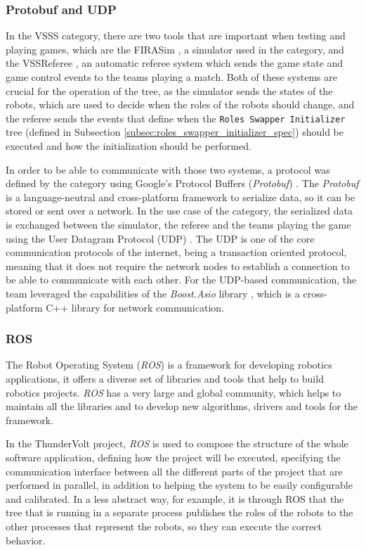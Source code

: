 \subsubsection{Protobuf and UDP}

In the VSSS category, there are two tools that are important when testing and playing games, which are the FIRASim \cite{FIRASim}, a simulator used in the category, and the VSSReferee \cite{VSSReferee}, an automatic referee system which sends the game state and game control events to the teams playing a match. Both of these systems are crucial for the operation of the tree, as the simulator sends the states of the robots, which are used to decide when the roles of the robots should change, and the referee sends the events that define when the \texttt{Roles Swapper Initializer} tree (defined in Subsection \ref{subsec:roles_swapper_initializer_spec}) should be executed and how the initialization should be performed.

In order to be able to communicate with those two systems, a protocol was defined by the category \cite{VSSProto} using Google's Protocol Buffers (\textit{Protobuf}) \cite{Protobuf}. The \textit{Protobuf} is a language-neutral and cross-platform framework to serialize data, so it can be stored or sent over a network. In the use case of the category, the serialized data is exchanged between the simulator, the referee and the teams playing the game using the User Datagram Protocol (UDP) \cite{rfc768}. The UDP is one of the core communication protocols of the internet, being a transaction oriented protocol, meaning that it does not require the network nodes to establish a connection to be able to communicate with each other. For the UDP-based communication, the team leveraged the capabilities of the \textit{Boost.Asio} library \cite{BoostAsio}, which is a cross-platform C++ library for network communication.

\subsubsection{ROS}

The Robot Operating System (\textit{ROS}) \cite{ROS} is a framework for developing robotics applications, it offers a diverse set of libraries and tools that help to build robotics projects. \textit{ROS} has a very large and global community, which helps to maintain all the libraries and to develop new algorithms, drivers and tools for the framework.

In the ThunderVolt project, \textit{ROS} is used to compose the structure of the whole software application, defining how the project will be executed, specifying the communication interface between all the different parts of the project that are performed in parallel, in addition to helping the system to be easily configurable and calibrated. In a less abstract way, for example, it is through ROS that the tree that is running in a separate process publishes the roles of the robots to the other processes that represent the robots, so they can execute the correct behavior.
